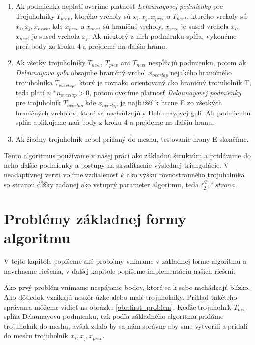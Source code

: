 \begin{enumerate}
{\begin{itemize}
    \end{itemize}
    }
    \item{
        Ak podmienka neplatí overíme platnosť \textit{Delaunayovej podmienky} pre Trojuholníky 
        $T_{prev}$, ktorého vrcholy sú $x_i, x_j, x_{prev}$ a $T_{next}$, ktorého vrcholy sú 
        $x_i, x_j, x_{next}$, kde $x_{prev}$ a $x_{next}$ sú hraničné vrcholy, $x_{prev}$ 
        je sused vrchola $x_i$, $x_{next}$ je sused vrchola $x_j$. Ak niektorý z nich podmienku
        spĺňa, vykonáme preň body zo kroku 4 a prejdeme na ďalšiu hranu.
    }
    \item{
        Ak všetky trojuholníky $T_{new}$, $T_{prev}$ ani $T_{next}$ nespĺňajú podmienku, potom 
        ak \textit{Delaunayova guľa} obsajuhe hraničný vrchol $x_{overlap}$ nejakého hraničného 
        trojuholníka $T_{overlap}$, ktorý je rovnako orientovaný ako hraničný trojuholník T, teda
        platí $n*n_{overlap} > 0$, potom overíme platnosť \textit{Delaunayovej podmienky} pre 
        trojuholník $T_{overlap}$ kde $x_{overlap}$ je najbližší k hrane E zo všetkých hraničných
        vrcholov, ktoré sa nachádzajú v Delaunayovej guli. Ak podmienku spĺňa aplikujeme naň body z 
        kroku 4 a prejdeme na ďalšiu hranu.
    }
    \item{
        Ak žiadny trojuholník nebol pridaný do meshu, testovanie hrany E skončíme.
    }
\end{enumerate}

Tento algoritmus používame v našej práci ako základnú štruktúru a pridávame do neho ďalšie podmienky 
a postupy na skvalitnenie výslednej triangulácie. V neadaptívnej verzií volíme vzdialenosť $k$ ako 
výšku rovnostranného trojuholníka so stranou dĺžky zadanej ako vstupný parameter algoritmu, teda 
$\frac{\sqrt{3}}{2}*strana$.

\section{Problémy základnej formy algoritmu}

V tejto kapitole popíšeme aké problémy vnímame v základnej forme algoritmu a navrhneme riešenia, v 
ďalšej kapitole popíšeme implementáciu našich riešení.

Ako prvý problém vnímame nespájanie bodov, ktoré sa k sebe nachádzajú blízko. Ako dôsledok vznikajú neskôr
úzke alebo malé trojuholníky. Príklad takétoho správania môžeme vidieť na obrázku \ref{obr:first_problem}.
Keďže trojuholník $T_{new}$ spĺňa Delaunayovu podmienku, tak podľa základného algoritmu pridáme trojuholník
do meshu, avšak zdalo by sa nám správne aby sme vytvorili a pridali do meshu trojuholník 
$x_i, x_j, x_{prev}$. 

